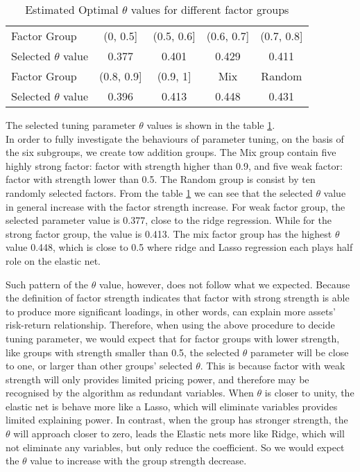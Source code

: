 \begin{table}[]
	\centering
	\caption{Estimated Optimal $\theta$ values for different factor groups}
	\label{table:optimal_theta}
	\begin{tabular}{l|cccc}
		\hline
		\hline
		Factor Group            & (0, 0.5{]}   & (0.5, 0.6{]} & (0.6, 0.7{]} & (0.7, 0.8{]} \\ 
		Selected $\theta$ value & 0.377        & 0.401        & 0.429        & 0.411        \\ \hline
		Factor Group            & (0.8, 0.9{]} & (0.9, 1{]}   & Mix          & Random       \\ 
		Selected $\theta$ value & 0.396        & 0.413        & 0.448        & 0.431        \\ \hline
		\hline
	\end{tabular}
\end{table}
The selected tuning parameter $\theta$ values is shown in the table \ref{table:optimal_theta}.\\
In order to fully investigate the behaviours of parameter tuning, on the basis of the six subgroups, we create tow addition groups.
The Mix group contain five highly strong factor: factor with strength higher than 0.9, and five weak factor: factor with strength lower than 0.5.
The Random group is consist by ten randomly selected factors.
From the table \ref{table:optimal_theta} we can see that the selected $\theta$ value in general increase with the factor strength increase.
For weak factor group, the selected parameter value is 0.377, close to the ridge regression.
While for the strong factor group, the value is 0.413.
The mix factor group has the highest $\theta$ value 0.448, which is close to 0.5 where ridge and Lasso regression each plays half role on the elastic net.

Such pattern of the $\theta$ value, however, does not follow what we expected.
Because the definition of factor strength indicates that factor with strong strength is able to produce more significant loadings, in other words, can explain more assets' risk-return relationship.
Therefore, when using the above procedure to decide tuning parameter, we would expect that for factor groups with lower strength, like groups with strength smaller than 0.5, the selected $\theta$ parameter will be close to one, or larger than other groups' selected $\theta$.
This is because factor with weak strength will only provides limited pricing power, and therefore may be recognised by the algorithm as redundant variables.
When $\theta$ is closer to unity, the elastic net is behave more like a Lasso, which will eliminate variables provides limited explaining power.
In contrast, when the group has stronger strength, the $\theta$ will approach closer to zero, leads the Elastic nets more like Ridge, which will not eliminate any variables, but only reduce the coefficient.
So we would expect the $\theta$ value to increase with the group strength decrease.

